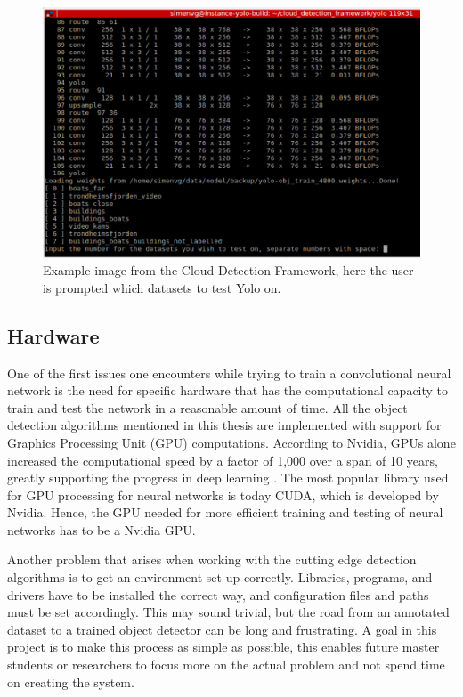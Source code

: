 \begin{figure}[h!]
    \centering
    \includegraphics[width=0.8 \textwidth]{images/cloud_detection_pic.eps}
    \caption{Example image from the Cloud Detection Framework, here the user is prompted which datasets to test Yolo on.}
    \label{fig:cloud_det}
\end{figure}

\subsection{Hardware}
One of the first issues one encounters while trying to train a convolutional neural network is the need for specific hardware that has the computational capacity to train and test the network in a reasonable amount of time. All the object detection algorithms mentioned in this thesis are implemented with support for Graphics Processing Unit (GPU) computations. According to Nvidia, GPUs alone increased the computational speed by a factor of 1,000 over a span of 10 years, greatly supporting the progress in deep learning \citep{Dettmers2015}. The most popular library used for GPU processing for neural networks is today CUDA, which is developed by Nvidia. Hence, the GPU needed for more efficient training and testing of neural networks has to be a Nvidia GPU. 

\vspace{3mm}

Another problem that arises when working with the cutting edge detection algorithms is to get an environment set up correctly. Libraries, programs, and drivers have to be installed the correct way, and configuration files and paths must be set accordingly. This may sound trivial, but the road from an annotated dataset to a trained object detector can be long and frustrating. A goal in this project is to make this process as simple as possible, this enables future master students or researchers to focus more on the actual problem and not spend time on creating the system. 

